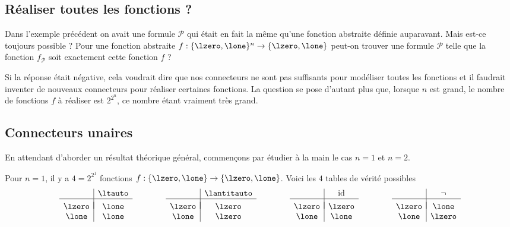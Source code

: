 \documentclass[11pt,class=report,crop=false]{standalone}
\begin{document}
\subsection{Réaliser toutes les fonctions ?}

Dans l'exemple précédent on avait une formule $\mathcal{P}$  qui était en fait la même qu'une fonction abstraite définie auparavant.
Mais est-ce toujours possible ?
Pour une fonction abstraite $f: \{\lzero,\lone\}^n \to \{\lzero,\lone\}$ peut-on trouver une formule $\mathcal{P}$ telle que la fonction $f_{\mathcal{P}}$ soit exactement cette fonction $f$ ?
	
Si la réponse était négative, cela voudrait dire que nos connecteurs ne sont pas suffisants pour modéliser toutes les fonctions et il faudrait inventer de nouveaux connecteurs pour réaliser certaines fonctions.
La question se pose d'autant plus que, lorsque $n$ est grand, le nombre de fonctions $f$ à réaliser est $2^{2^n}$, ce nombre étant vraiment très grand. 	

\subsection{Connecteurs unaires}

En attendant d'aborder un résultat théorique général, commençons par étudier à la main le cas $n=1$ et $n=2$.

Pour $n=1$, il y a $4 = 2^{2^1}$ fonctions $f : \{\lzero,\lone\} \to \{\lzero,\lone\}$.
Voici les $4$ tables de vérité possibles 
\[
\begin{array}{c|c}
	& \ltauto \\
	\hline
	& \\[-2ex]
	\lzero & \lone \\
	\lone  & \lone \\
\end{array}
\qquad\qquad
\begin{array}{c|c}
	& \lantitauto \\
	\hline
	& \\[-2ex]
	\lzero & \lzero \\
	\lone  & \lzero \\
\end{array}
\qquad\qquad
\begin{array}{c|c}
	& \mathrm{id} \\
	\hline
	& \\[-2ex]
	\lzero & \lzero \\
	\lone  & \lone \\
\end{array}
\qquad\qquad
\begin{array}{c|c}
	& \lnot \\
	\hline
	& \\[-2ex]
	\lzero & \lone \\
	\lone  & \lzero \\
\end{array}
\]
\end{document}
